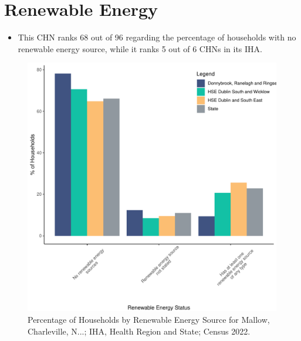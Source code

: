 \documentclass{article}
\begin{document}
\section{Renewable Energy}\label{sect:RE}
\begin{itemize}
\item This CHN ranks  68 out of 96 regarding the percentage of households with no renewable energy source, while it ranks   5 out of 6 CHNs in its IHA.
\end{itemize}
\begin{figure}[H]
	\centering
	\includegraphics[width = 140mm]{../figures/RenewableEnergyED.pdf}
	\caption{Percentage of Households by Renewable Energy Source for Mallow, Charleville, N...; IHA, Health Region and State; Census 2022.}
	\label{fig:vbnv}
	\end{figure}
\end{document}
